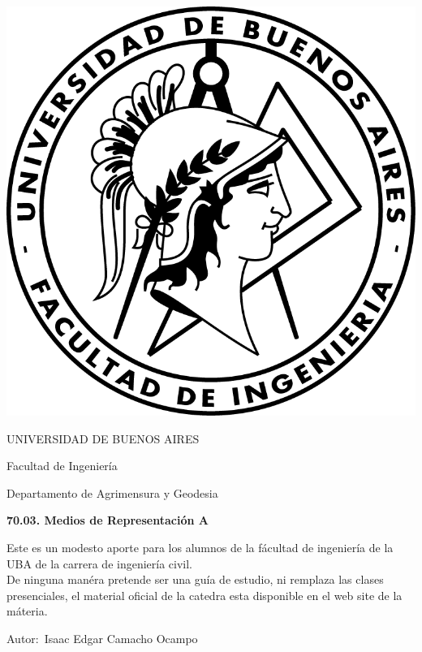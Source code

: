 \documentclass[12pt]{book}
\begin{document}
\thispagestyle{empty}

\begin {center}

\includegraphics[scale=.4]{Logo-fiuba_big.png}

\medskip
UNIVERSIDAD DE BUENOS AIRES

Facultad de Ingenier\'ia

Departamento de Agrimensura y Geodesia


\vspace{3cm}


\textbf{\large 70.03. Medios de Representación A}

\vspace{2cm}


Este es un modesto aporte para los alumnos de la f\'acultad de ingenier\'ia  de la UBA de la carrera de  ingenier\'ia civil.\\
De ninguna man\'era pretende ser una gu\'ia de estudio, ni remplaza las clases presenciales, el material oficial de la catedra esta disponible en el web site de la m\'ateria.
\\

\end {center}


\vspace{2.5cm}

\noindent Autor:\,	Isaac Edgar Camacho Ocampo
 
\end{document}
